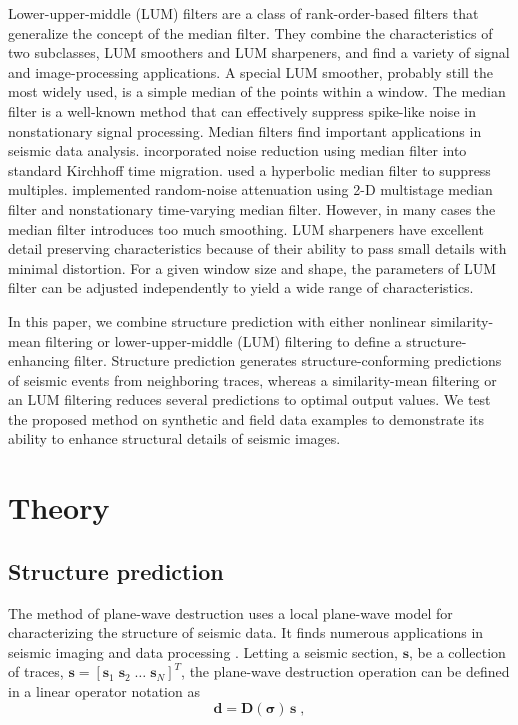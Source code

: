Lower-upper-middle (LUM) filters \cite[]{Hardie93} are a class of
rank-order-based filters that generalize the concept of the median
filter. They combine the characteristics of two subclasses, LUM
smoothers and LUM sharpeners, and find a variety of signal and
image-processing applications. A special LUM smoother, probably still
the most widely used, is a simple median of the points within a
window. The median filter is a well-known method that can effectively
suppress spike-like noise in nonstationary signal processing. Median
filters find important applications in seismic data
analysis. \cite{Mi00} incorporated noise reduction
using median filter into standard Kirchhoff time
migration. \cite{Zhang03} used a hyperbolic median filter to suppress
multiples. \cite{Liu06,Liu09a} implemented random-noise attenuation
using 2-D multistage median filter and nonstationary time-varying
median filter. However, in many cases the median filter introduces too
much smoothing. LUM sharpeners have excellent detail preserving
characteristics because of their ability to pass small details with
minimal distortion. For a given window size and shape, the parameters
of LUM filter can be adjusted independently to yield a wide range of
characteristics.

In this paper, we combine structure prediction \cite[]{Fomel08a} with
either nonlinear similarity-mean filtering or lower-upper-middle (LUM)
filtering to define a structure-enhancing filter. Structure prediction
generates structure-conforming predictions of seismic events from
neighboring traces, whereas a similarity-mean filtering or an LUM
filtering reduces several predictions to optimal output values. We
test the proposed method on synthetic and field data examples to
demonstrate its ability to enhance structural details of seismic
images.

\section{Theory}

\subsection{Structure prediction}

The method of plane-wave destruction \cite[]{Claerbout92} uses a local
plane-wave model for characterizing the structure of seismic data. It
finds numerous applications in seismic imaging and data processing
\cite[]{Fomel02}. Letting a seismic section, $\mathbf{s}$, be a
collection of traces, $\mathbf{s} = \left[\mathbf{s}_1 \;
\mathbf{s}_2 \; \ldots \; \mathbf{s}_N\right]^T$, the plane-wave destruction 
operation can be defined in a linear operator notation as
\begin{equation}
  \label{eq:pwd}
  \mathbf{d} = \mathbf{D(\sigma)\,s}\;,
\end{equation}

